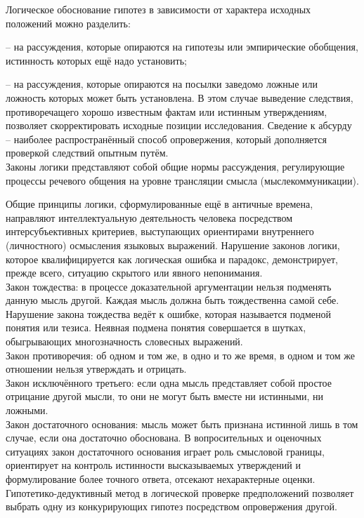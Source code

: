 \documentclass[exam_answers.tex]{subfiles}
\begin{document}
\renewcommand{\baselinestretch}{\blch}

Логическое обоснование гипотез в зависимости от характера исходных положений можно разделить:

-- на рассуждения, которые опираются на гипотезы или эмпирические обобщения, истинность которых ещё надо установить;

-- на рассуждения, которые опираются на посылки заведомо ложные или ложность которых может быть установлена.
В этом случае выведение следствия, противоречащего хорошо известным фактам или истинным утверждениям, позволяет скорректировать исходные позиции исследования.
Сведение к абсурду – наиболее распространённый способ опровержения, который дополняется проверкой следствий опытным путём.
\\

Законы логики представляют собой общие нормы рассуждения, регулирующие процессы речевого общения на уровне трансляции смысла (мыслекоммуникации).

Общие принципы логики, сформулированные ещё в античные времена, направляют интеллектуальную деятельность человека посредством интерсубъективных критериев, выступающих ориентирами внутреннего (личностного) осмысления языковых выражений.
Нарушение законов логики, которое квалифицируется как логическая ошибка и парадокс, демонстрирует, прежде всего, ситуацию скрытого или явного непонимания.
\\

Закон тождества: в процессе доказательной аргументации нельзя подменять данную мысль другой.
Каждая мысль должна быть тождественна самой себе.
Нарушение закона тождества ведёт к ошибке, которая называется подменой понятия или тезиса.
Неявная подмена понятия совершается в шутках, обыгрывающих многозначность словесных выражений.
\\

Закон противоречия: об одном и том же, в одно и то же время, в одном и том же отношении нельзя утверждать и отрицать.
\\

Закон исключённого третьего: если одна мысль представляет собой простое отрицание другой мысли, то они не могут быть вместе ни истинными, ни ложными.
\\

Закон достаточного основания: мысль может быть признана истинной лишь в том случае, если она достаточно обоснована.
В вопросительных и оценочных ситуациях закон достаточного основания играет роль смысловой границы, ориентирует на контроль истинности высказываемых утверждений и формулирование более точного ответа, отсекают нехарактерные оценки.
\\

Гипотетико-дедуктивный метод в логической проверке предположений позволяет выбрать одну из конкурирующих гипотез посредством опровержения другой.
\end{document}
